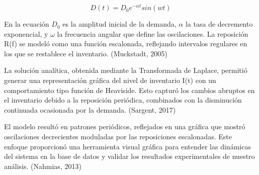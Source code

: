 \documentclass[12pt]{article}
\begin{document}
\begin{equation}
D(t) = D_{0}e^{- \alpha t}sin(wt)
\end{equation}

En la ecuación $D_{0}$ es la amplitud inicial de la demanda, $\alpha$ la tasa de decremento exponencial, y $\omega$ la frecuencia angular que define las oscilaciones. La reposición R(f) se modeló como una función escalonada, reflejando intervalos regulares en los que se restablece el inventario. (Muckstadt, 2005)

La solución analítica, obtenida mediante la Transformada de Laplace, permitió generar una representación gráfica del nivel de inventario I(t) con un comportamiento tipo función de Heaviside. Esto capturó los cambios abruptos en el inventario debido a la reposición periódica, combinados con la disminución continuada ocasionada por la demanda. (Sargent, 2017)

El modelo resultó en patrones periódicos, reflejados en una gráfica que mostró oscilaciones decrecientes moduladas por las reposiciones escalonadas. Este enfoque proporcionó una herramienta visual gráfica para entender las dinámicas del sistema en la base de datos y validar los resultados experimentales de nuestro análisis. (Nahmias, 2013)
\end{document}
